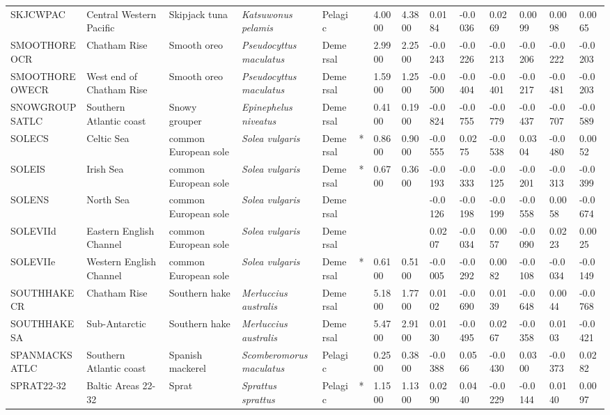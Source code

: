 \begin{longtable}{p{2.8cm}p{2cm}p{1.7cm}p{1.7cm}p{1cm}p{0.3cm}p{1cm}p{1cm}p{1cm}p{1cm}p{1cm}p{1cm}p{1cm}p{1cm}}
  SKJCWPAC & Central Western Pacific & Skipjack tuna & \textit{Katsuwonus pelamis} & Pelagic &   & 4.0000 & 4.3800 & 0.0184 & -0.0036 & 0.0269 & 0.0099 & 0.0098 & 0.0065 \\ 
  SMOOTHOREOCR & Chatham Rise & Smooth oreo & \textit{Pseudocyttus maculatus} & Demersal &   & 2.9900 & 2.2500 & -0.0243 & -0.0226 & -0.0213 & -0.0206 & -0.0222 & -0.0203 \\ 
  SMOOTHOREOWECR & West end of Chatham Rise & Smooth oreo & \textit{Pseudocyttus maculatus} & Demersal &   & 1.5900 & 1.2500 & -0.0500 & -0.0404 & -0.0401 & -0.0217 & -0.0481 & -0.0203 \\ 
  SNOWGROUPSATLC & Southern Atlantic coast & Snowy grouper & \textit{Epinephelus niveatus} & Demersal &   & 0.4100 & 0.1900 & -0.0824 & -0.0755 & -0.0779 & -0.0437 & -0.0707 & -0.0589 \\ 
  SOLECS & Celtic Sea & common European sole & \textit{Solea vulgaris} & Demersal & * & 0.8600 & 0.9000 & -0.0555 & 0.0275 & -0.0538 & 0.0304 & -0.0480 & 0.0052 \\ 
  SOLEIS & Irish Sea & common European sole & \textit{Solea vulgaris} & Demersal & * & 0.6700 & 0.3600 & -0.0193 & -0.0333 & -0.0125 & -0.0201 & -0.0313 & -0.0399 \\ 
  SOLENS & North Sea & common European sole & \textit{Solea vulgaris} & Demersal &  &  &  & -0.0126 & -0.0198 & -0.0199 & -0.0558 & 0.0058 & -0.0674 \\ 
  SOLEVIId & Eastern English Channel & common European sole & \textit{Solea vulgaris} & Demersal &  &  &  & 0.0207 & -0.0034 & 0.0057 & -0.0090 & 0.0223 & 0.0025 \\ 
  SOLEVIIe & Western English Channel & common European sole & \textit{Solea vulgaris} & Demersal & * & 0.6100 & 0.5100 & -0.0005 & -0.0292 & 0.0082 & -0.0108 & -0.0034 & -0.0149 \\ 
  SOUTHHAKECR & Chatham Rise & Southern hake & \textit{Merluccius australis} & Demersal &   & 5.1800 & 1.7700 & 0.0102 & -0.0690 & 0.0139 & -0.0648 & 0.0044 & -0.0768 \\ 
  SOUTHHAKESA & Sub-Antarctic & Southern hake & \textit{Merluccius australis} & Demersal &   & 5.4700 & 2.9100 & 0.0130 & -0.0495 & 0.0267 & -0.0358 & 0.0103 & -0.0421 \\ 
  SPANMACKSATLC & Southern Atlantic coast & Spanish mackerel & \textit{Scomberomorus maculatus} & Pelagic &   & 0.2500 & 0.3800 & -0.0388 & 0.0566 & -0.0430 & 0.0300 & -0.0373 & 0.0282 \\ 
  SPRAT22-32 & Baltic Areas 22-32 & Sprat & \textit{Sprattus sprattus} & Pelagic & * & 1.1500 & 1.1300 & 0.0290 & 0.0440 & -0.0229 & -0.0144 & 0.0140 & 0.0097 \\ 

\end{longtable}

